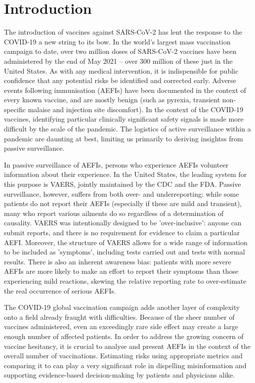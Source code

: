 \documentclass[preprints,communication,submit,oneauthor,pdftex]{Definitions/mdpi}
\begin{document}
\setcounter{section}{-1} %
\section{Introduction} %
\label{sec:introduction}

The introduction of vaccines against SARS-CoV-2 has lent the response to the COVID-19 a new string to its bow. In the world's largest mass vaccination campaign to date, \cite{bagcchi2021world,li2021comprehensive,mathieu2021global} over two million doses of SARS-CoV-2 vaccines have been administered by the end of May 2021 – over 300 million of these just in the United States. As with any medical intervention, it is indispensible for public confidence that any potential risks be identified and corrected early. Adverse events following immunisation (AEFIs) have been documented in the context of every known vaccine, and are mostly benign (such as pyrexia, transient non-specific malaise and injection site discomfort). In the context of the COVID-19 vaccines, identifying particular clinically significant safety signals is made more difficult by the scale of the pandemic. The logistics of active surveillance within a pandemic are daunting at best, limiting us primarily to deriving insightss from passive surveillance.

In passive surveillance of AEFIs, persons who experience AEFIs volunteer information about their experience. In the United States, the leading system for this purpose is VAERS, jointly maintained by the CDC and the FDA. Passive surveillance, however, suffers from both over- and underreporting: while some patients do not report their AEFIs (especially if these are mild and transient), many who report various ailments do so regardless of a determination of causality. VAERS was intentionally designed to be 'over-inclusive': anyone can submit reports, and there is no requirement for evidence to claim a particular AEFI. Moreover, the structure of VAERS allows for a wide range of information to be included as 'symptoms', including tests carried out and tests with normal results. There is also an inherent awareness bias: patients with more severe AEFIs are more likely to make an effort to report their symptoms than those experiencing mild reactions, skewing the relative reporting rate to over-estimate the real occurrence of serious AEFIs.\cite{varricchio2004understanding} 

The COVID-19 global vaccination campaign adds another layer of complexity onto a field already fraught with difficulties. Because of the sheer number of vaccines administered, even an exceedingly rare side effect may create a large enough number of affected patients. In order to address the growing concern of vaccine hesitancy,\cite{khubchandani2021covid,peretti2020future,razai2021covid} it is crucial to analyse and present AEFIs in the context of the overall number of vaccinations. Estimating risks using appropriate metrics and comparing it to can play a very significant role in dispelling misinformation and supporting evidence-based decision-making by patients and physicians alike.\cite{loomba2021measuring,roozenbeek2020susceptibility}
\end{document}
